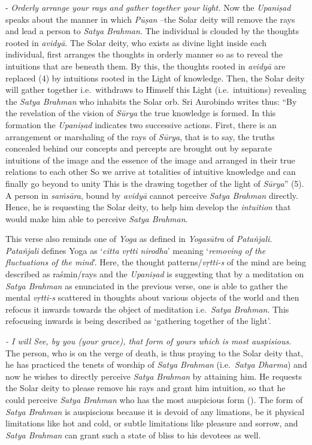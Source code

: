 - \emph{Orderly arrange your rays and gather together your light.} Now the \emph{Upaniṣad} speaks about the manner in which \emph{Pūṣan} --the Solar deity will remove the rays and lead a person to \emph{Satya Brahman}. The individual is clouded by the thoughts rooted in \emph{avidyā}. The Solar deity, who exists as divine light inside each individual, first arranges the thoughts in orderly manner so as to reveal the intuitions that are beneath them. By this, the thoughts rooted in \emph{avidyā} are replaced (4) by intuitions rooted in the Light of knowledge. Then, the Solar deity will gather together i.e.\ withdraws to Himself this Light (i.e.\ intuitions) revealing the \emph{Satya Brahman} who inhabits the Solar orb. Sri Aurobindo writes thus: ``By the revelation of the vision of \emph{Sūrya} the true knowledge is formed. In this formation the \emph{Upaniṣad} indicates two successive actions. First, there is an arrangement or marshaling of the rays of \emph{Sūrya}, that is to say, the truths concealed behind our concepts and percepts are brought out by separate intuitions of the image and the essence of the image and arranged in their true relations to each other So we arrive at totalities of intuitive knowledge and can finally go beyond to unity This is the drawing together of the light of \emph{Sūrya}'' (5). A person in \emph{saṁsāra}, bound by \emph{avidyā} cannot perceive \emph{Satya Brahman} directly. Hence, he is requesting the Solar deity, to help him develop the \emph{intuition} that would make him able to perceive \emph{Satya Brahman}.

This verse also reminds one of \emph{Yoga} as defined in \emph{Yogasūtra} of \emph{Patañjali}. \emph{Patañjali} defines Yoga as `\emph{citta vṛtti nirodha}' meaning `\emph{removing of the fluctuations of the mind}'. Here, the thought patterns/\emph{vṛtti-s} of the mind are being described as raśmin/rays and the \emph{Upaniṣad} is suggesting that by a meditation on \emph{Satya Brahman} as enunciated in the previous verse, one is able to gather the mental \emph{vṛtti-s} scattered in thoughts about various objects of the world and then refocus it inwards towards the object of meditation i.e.\ \emph{Satya Brahman}. This refocusing inwards is being described as `gathering together of the light'.

\emph{- I will See, by you (your grace), that form of yours which is most auspisious}. The person, who is on the verge of death, is thus praying to the Solar deity that, he has practiced the tenets of worship of \emph{Satya Brahman} (i.e.\ \emph{Satya Dharma}) and now he wishes to directly perceive \emph{Satya Brahman} by attaining him. He requests the Solar deity to please remove his rays and grant him intuition, so that he could perceive \emph{Satya Brahman} who has the most auspicious form (). The form of \emph{Satya Brahman} is auspiscious because it is devoid of any limations, be it physical limitations like hot and cold, or subtle limitations like pleasure and sorrow, and \emph{Satya Brahman} can grant such a state of bliss to his devotees as well.

